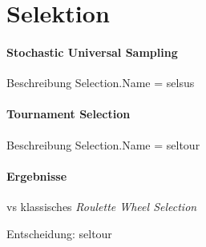 \section{Selektion}\label{selection}


\paragraph{Stochastic Universal Sampling}
Beschreibung
Selection.Name = selsus

\paragraph{Tournament Selection}
Beschreibung
Selection.Name = seltour

\paragraph{Ergebnisse}
vs klassisches \emph{Roulette Wheel Selection}



Entscheidung: seltour